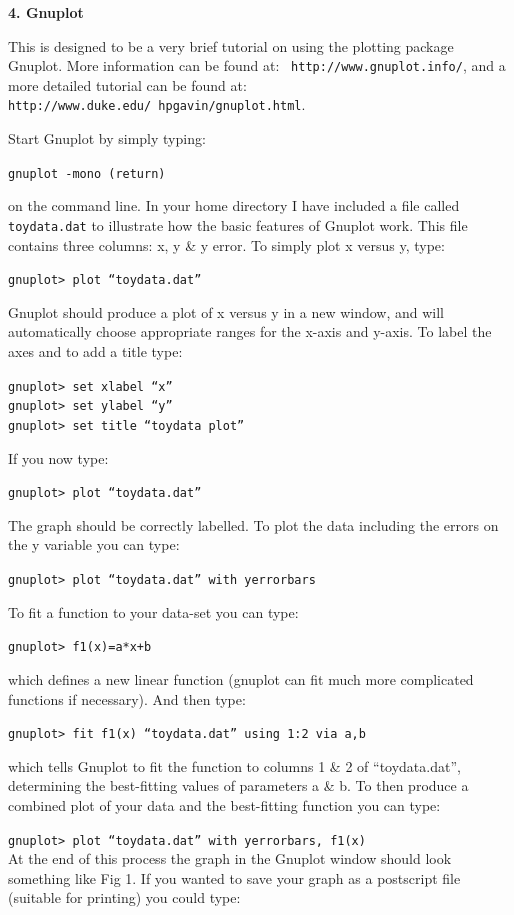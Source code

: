\documentclass[12pt]{article}
\begin{document}
\newpage

\begin{center}
{\large{\bf 4. Gnuplot}}
\end{center}
This is designed to be a very brief tutorial on using the plotting
package Gnuplot. More information can be found at: {\tt
http://www.gnuplot.info/}, and a more detailed tutorial can be found
at: {\tt http://www.duke.edu/~hpgavin/gnuplot.html}.

Start Gnuplot by simply typing:

{\tt gnuplot -mono (return)}

on the command line. In your home directory I have included a file
called {\tt toydata.dat} to illustrate how the basic features of
Gnuplot work. This file contains three columns: x, y \& y error. 
To simply plot x versus y, type:

{\tt gnuplot> plot ``toydata.dat''}

Gnuplot should produce a plot of x versus y in a new window, and will
automatically choose appropriate ranges for the x-axis and y-axis. To
label the axes and to add a title type:

{\tt gnuplot> set xlabel ``x''}\\
{\tt gnuplot> set ylabel ``y''}\\
{\tt gnuplot> set title ``toydata plot''}

If you now type:

{\tt gnuplot> plot ``toydata.dat''}

The graph should be correctly labelled. To plot the data including the
errors on the y variable you can type:

{\tt gnuplot> plot ``toydata.dat'' with yerrorbars}

To fit a function to your data-set you can type:

{\tt gnuplot> f1(x)=a*x+b}

which defines a new linear function (gnuplot can fit much more
complicated functions if necessary). And then type:

{\tt gnuplot> fit f1(x) ``toydata.dat'' using 1:2 via a,b}

which tells Gnuplot to fit the function to columns 1 \& 2 of
``toydata.dat'', determining the best-fitting values of parameters a
\& b. To then produce a combined plot of your data and the best-fitting
function you can type:

{\tt gnuplot> plot ``toydata.dat'' with yerrorbars, f1(x)}\\
\newpage
At the end of this process the graph in the Gnuplot window should look
something like Fig 1. If you wanted to save your graph as a postscript
file (suitable for printing) you could type:
\end{document}
